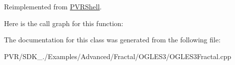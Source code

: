 Reimplemented from \hyperlink{class_p_v_r_shell_ae0eb5f797cbe993a22b8659f9c332578}{P\+V\+R\+Shell}.



Here is the call graph for this function\+:




The documentation for this class was generated from the following file\+:\begin{DoxyCompactItemize}
\item 
P\+V\+R/\+S\+D\+K\+\_./\+Examples/\+Advanced/\+Fractal/\+O\+G\+L\+E\+S3/O\+G\+L\+E\+S3\+Fractal.\+cpp\end{DoxyCompactItemize}
